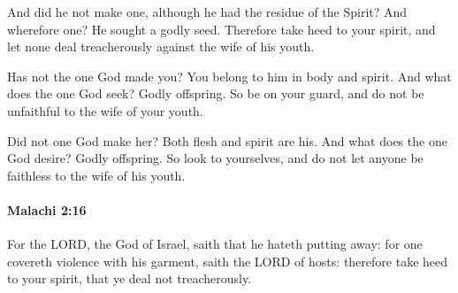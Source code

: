 			\begin{versebox}
					\item[BHS] 
					\item[LXX] 
					\item[ASV] And did he not make one, although he had the residue of the Spirit? And wherefore one? He sought a godly seed. Therefore take heed to your spirit, and let none deal treacherously against the wife of his youth.
					\item[NIV] Has not the one God made you? You belong to him in body and spirit. And what does the one God seek? Godly offspring. So be on your guard, and do not be unfaithful to the wife of your youth.
					\item[NRSV] Did not one God make her? Both flesh and spirit are his. And what does the one God desire? Godly offspring. So look to yourselves, and do not let anyone be faithless to the wife of his youth.
			\end{versebox}

		\paragraph{Malachi 2:16} %
			\label{MALACHI-2-16}

			For the LORD, the God of Israel, saith that he hateth putting away: for one covereth violence with his garment, saith the LORD of hosts: therefore take heed to your spirit, that ye deal not treacherously.

